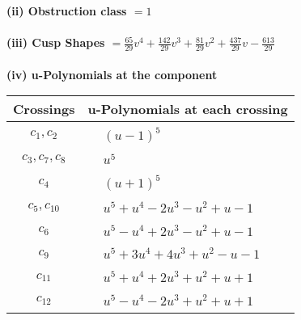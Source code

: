 \documentclass[1p]{elsarticle_modified}
\theoremstyle{definition}
\begin{document}
\flushleft \textbf{(ii) Obstruction class $= 1$}\\~\\
\flushleft \textbf{(iii) Cusp Shapes $= \frac{65}{29} v^4+\frac{142}{29} v^3+\frac{81}{29} v^2+\frac{437}{29} v-\frac{613}{29}$}\\~\\
\newpage\renewcommand{\arraystretch}{1}
\flushleft \textbf{(iv) u-Polynomials at the component}\newline \\
\begin{tabular}{m{50pt}|m{274pt}}
Crossings & \hspace{64pt}u-Polynomials at each crossing \\
\hline $$\begin{aligned}c_{1},c_{2}\end{aligned}$$&$\begin{aligned}
&(u-1)^5
\end{aligned}$\\
\hline $$\begin{aligned}c_{3},c_{7},c_{8}\end{aligned}$$&$\begin{aligned}
&u^5
\end{aligned}$\\
\hline $$\begin{aligned}c_{4}\end{aligned}$$&$\begin{aligned}
&(u+1)^5
\end{aligned}$\\
\hline $$\begin{aligned}c_{5},c_{10}\end{aligned}$$&$\begin{aligned}
&u^5+u^4-2 u^3- u^2+u-1
\end{aligned}$\\
\hline $$\begin{aligned}c_{6}\end{aligned}$$&$\begin{aligned}
&u^5- u^4+2 u^3- u^2+u-1
\end{aligned}$\\
\hline $$\begin{aligned}c_{9}\end{aligned}$$&$\begin{aligned}
&u^5+3 u^4+4 u^3+u^2- u-1
\end{aligned}$\\
\hline $$\begin{aligned}c_{11}\end{aligned}$$&$\begin{aligned}
&u^5+u^4+2 u^3+u^2+u+1
\end{aligned}$\\
\hline $$\begin{aligned}c_{12}\end{aligned}$$&$\begin{aligned}
&u^5- u^4-2 u^3+u^2+u+1
\end{aligned}$\\
\hline
\end{tabular}\\~\\
\end{document}
